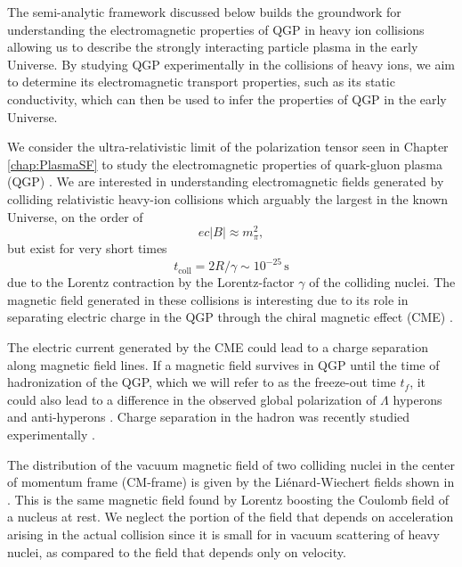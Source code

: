 {\color{black} The semi-analytic framework discussed below builds the groundwork for understanding the electromagnetic properties of QGP in heavy ion collisions allowing us to describe the strongly interacting particle plasma in the early Universe. By studying QGP experimentally in the collisions of heavy ions, we aim to determine its electromagnetic transport properties, such as its static conductivity, which can then be used to infer the properties of QGP in the early Universe.}

We consider the ultra-relativistic limit of the polarization tensor seen in Chapter \ref{chap:PlasmaSF} to study the electromagnetic properties of quark-gluon plasma (QGP) \cite{Grayson:2022asf}. We are interested in understanding  electromagnetic fields generated by colliding relativistic heavy-ion collisions which arguably  the largest in the known Universe, on the order of 
\begin{equation}\label{eq:Bcol}
ec|B| \approx m_\pi^2,
\end{equation}
but exist for very short times 
\begin{equation}\label{eq:tcol}
t_{\text{coll}}= 2 R/\gamma \sim 10^{-25}\,\textrm{s}
\end{equation}
due to the Lorentz contraction by the Lorentz-factor $\gamma$ of the colliding nuclei. The magnetic field generated in these collisions is interesting due to its role in separating electric charge in the QGP through the chiral magnetic effect (CME) \cite{Kharzeev:2007jp}.

The electric current generated by the CME could lead to a charge separation along magnetic field lines. If a magnetic field survives in QGP until the time of hadronization of the QGP, which we will refer to as the freeze-out time $t_f$, it could also lead to a difference in the observed global polarization of $\Lambda$ hyperons and anti-hyperons \cite{Muller:2018ibh}. Charge separation in the hadron was recently studied experimentally \cite{STAR:2023jdd}. 

The distribution of the vacuum magnetic field of two colliding nuclei in the center of momentum frame (CM-frame) is given by the Li\'enard-Wiechert fields shown in . This is the same magnetic field found by Lorentz boosting the Coulomb field of a nucleus at rest. We neglect the portion of the field that depends on acceleration arising in the actual collision since it is small for in vacuum scattering of heavy nuclei, as compared to the field that depends only on velocity.

